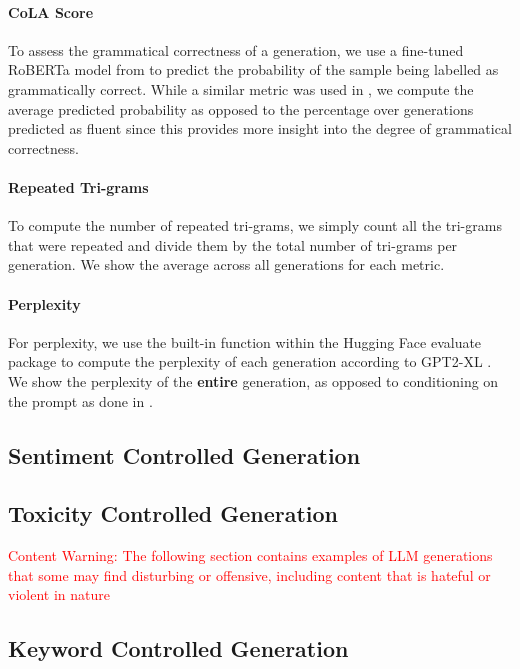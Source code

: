 \paragraph{CoLA Score} To assess the grammatical correctness of a generation, we use a fine-tuned RoBERTa model from \citet{morris2020textattack} to predict the probability of the sample being labelled as grammatically correct. While a similar metric was used in \citet{kumar2022gradient}, we compute the average predicted probability as opposed to the percentage over generations predicted as fluent since this provides more insight into the degree of grammatical correctness. 

\paragraph{Repeated Tri-grams} To compute the number of repeated tri-grams, we simply count all the tri-grams that were repeated and divide them by the total number of tri-grams per generation. We show the average across all generations for each metric. 

\paragraph{Perplexity} For perplexity, we use the built-in function within the Hugging Face evaluate package to compute the perplexity of each generation according to GPT2-XL \citep{wolf2020huggingfacestransformersstateoftheartnatural}. We show the perplexity of the \textbf{entire} generation, as opposed to conditioning on the prompt as done in \citet{han2023lm, kumar2022gradient, liu2023bolt}. 

\subsection{Sentiment Controlled Generation}
\label{appndx:senti-details}


\subsection{Toxicity Controlled Generation}\textcolor{red}{Content Warning: The following section contains examples of LLM generations that some may find disturbing or offensive, including content that is hateful or violent in nature}

\label{appndx:toxicity-details}


\subsection{Keyword Controlled Generation}
\label{appndx:keywords-details}

